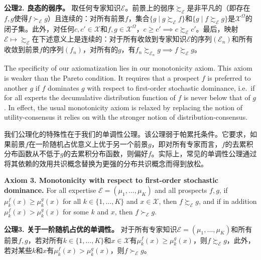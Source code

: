 \documentclass[12pt,a4paper]{article}
\newenvironment{original}
  {\par\noindent\ignorespaces}
  {\par}
\newenvironment{translation}
  {\par\noindent{\color{transblue}\ignorespaces}}
  {\par\medskip}
\begin{document}
\begin{translation}
\textbf{公理2. 良态的弱序。} 取任何专家知识$\mathcal{E}$。前景上的弱序$\succsim_{\mathcal{E}}$是非平凡的（即存在$f, g$使得$f \succ_{\mathcal{E}} g$）且连续的：对所有前景$f$，集合$\{g \mid g \succsim_{\mathcal{E}} f\}$和$\{g \mid f \succsim_{\mathcal{E}} g\}$是$\mathcal{X}^{\Omega}$的闭子集。此外，对任何$c, c' \in \mathcal{X}$和$f, g \in \mathcal{X}^{\Omega}$，$c \geq c' \implies c \succsim_{\mathcal{E}} c'$。最后，映射$\mathcal{E} \mapsto \succsim_{\mathcal{E}}$在下述意义上是连续的：对于所有收敛到专家知识$\mathcal{E}$的序列$(\mathcal{E}_{n})$和所有收敛到前景$f$的序列$(f_{n})$，对所有的$g$，有$f_{n} \succsim_{\mathcal{E}_{n}} g \implies f \succsim_{\mathcal{E}} g$。
\end{translation}

\begin{original}
The specificity of our axiomatization lies in our monotonicity axiom. This axiom is weaker than the Pareto condition. It requires that a prospect $f$ is preferred to another $g$ if $f$ dominates $g$ with respect to first-order stochastic dominance, i.e.\ if for all experts the decumulative distribution function of $f$ is never below that of $g$. In effect, the usual monotonicity axiom is relaxed by replacing the notion of utility-consensus it relies on with the stronger notion of distribution-consensus.
\end{original}

\begin{translation}
我们公理化的特殊性在于我们的单调性公理。该公理弱于帕累托条件。它要求，如果前景$f$在一阶随机占优意义上优于另一个前景$g$，即对所有专家而言，$f$的去累积分布函数从不低于$g$的去累积分布函数，则偏好$f$。实际上，常见的单调性公理通过将其依赖的效用共识概念替换为更强的分布共识概念而得到放松。
\end{translation}

\begin{original}
\textbf{Axiom 3. Monotonicity with respect to first-order stochastic dominance.} For all expertise $\mathcal{E} = (\mu_{1}, \dots, \mu_{K})$ and all prospects $f, g$, if $\mu_{k}^{f}(x) \geq \mu_{k}^{g}(x)$ for all $k \in \{1, \dots, K\}$ and $x \in \mathcal{X}$, then $f \succsim_{\mathcal{E}} g$, and if in addition $\mu_{k}^{f}(x) > \mu_{k}^{g}(x)$ for some $k$ and $x$, then $f \succ_{\mathcal{E}} g$.
\end{original}

\begin{translation}
\textbf{公理3. 关于一阶随机占优的单调性。} 对于所有专家知识$\mathcal{E} = (\mu_{1}, \dots, \mu_{K})$和所有前景$f, g$，若对所有$k \in \{1, \dots, K\}$和$x \in \mathcal{X}$有$\mu_{k}^{f}(x) \geq \mu_{k}^{g}(x)$，则$f \succsim_{\mathcal{E}} g$，此外，若对某些$k$和$x$有$\mu_{k}^{f}(x) > \mu_{k}^{g}(x)$，则$f \succ_{\mathcal{E}} g$。
\end{translation}
\end{document}
